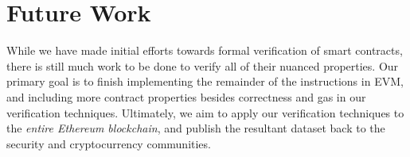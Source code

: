 \section{Future Work}
While we have made initial efforts towards formal verification of smart
contracts, there is still much work to be done to verify all of their nuanced
properties. Our primary goal is to finish implementing the remainder of the
instructions in EVM, and including more contract properties besides correctness
and gas in our verification techniques. Ultimately, we aim to apply our
verification techniques to the \textit{entire Ethereum blockchain}, and
publish the resultant dataset back to the security and cryptocurrency
communities.
